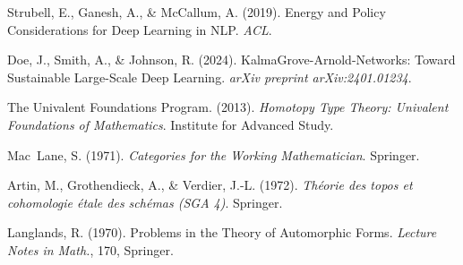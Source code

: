 \documentclass{article}
\begin{document}

\begin{thebibliography}{99}

Strubell, E., Ganesh, A., \& McCallum, A. (2019).
Energy and Policy Considerations for Deep Learning in NLP.
\emph{ACL}.

Doe, J., Smith, A., \& Johnson, R. (2024).
KalmaGrove-Arnold-Networks: Toward Sustainable Large-Scale Deep Learning.
\emph{arXiv preprint arXiv:2401.01234}.

The Univalent Foundations Program. (2013).
\emph{Homotopy Type Theory: Univalent Foundations of Mathematics}.
Institute for Advanced Study.

Mac~Lane, S. (1971).
\emph{Categories for the Working Mathematician}.
Springer.

Artin, M., Grothendieck, A., \& Verdier, J.-L. (1972).
\emph{Théorie des topos et cohomologie étale des schémas (SGA 4)}.
Springer.

Langlands, R. (1970).
Problems in the Theory of Automorphic Forms.
\emph{Lecture Notes in Math.}, 170, Springer.

\end{thebibliography}
\end{document}
